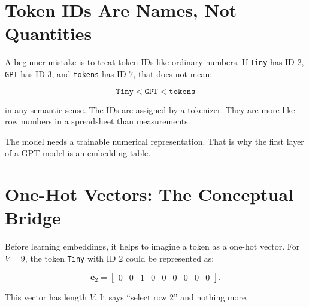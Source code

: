 \section{Token IDs Are Names, Not Quantities}

A beginner mistake is to treat token IDs like ordinary numbers. If \texttt{Tiny} has ID \(2\), \texttt{GPT} has ID \(3\), and \texttt{tokens} has ID \(7\), that does not mean:

\[
\texttt{Tiny} < \texttt{GPT} < \texttt{tokens}
\]

in any semantic sense. The IDs are assigned by a tokenizer. They are more like row numbers in a spreadsheet than measurements.

\begin{center}
\end{center}

The model needs a trainable numerical representation. That is why the first layer of a GPT model is an embedding table.

\section{One-Hot Vectors: The Conceptual Bridge}

Before learning embeddings, it helps to imagine a token as a one-hot vector. For \(V=9\), the token \texttt{Tiny} with ID \(2\) could be represented as:

\[
\mathbf{e}_2 =
\begin{bmatrix}
0&0&1&0&0&0&0&0&0
\end{bmatrix}.
\]

This vector has length \(V\). It says ``select row 2'' and nothing more.

